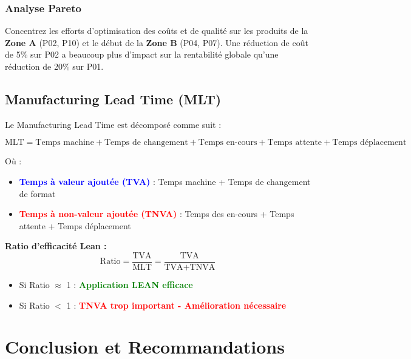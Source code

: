 \documentclass[11pt,a4paper]{article}
\begin{document}
\subsubsection{Analyse Pareto}
Concentrez les efforts d'optimisation des coûts et de qualité sur les produits de la \textbf{Zone A} (P02, P10) et le début de la \textbf{Zone B} (P04, P07). Une réduction de coût de 5\% sur P02 a beaucoup plus d'impact sur la rentabilité globale qu'une réduction de 20\% sur P01.

\newpage
\subsection{Manufacturing Lead Time (MLT)}

Le Manufacturing Lead Time est décomposé comme suit :

\begin{equation}
\text{MLT} = \text{Temps machine} + \text{Temps de changement} + \text{Temps en-cours} + \text{Temps attente} + \text{Temps déplacement}
\end{equation}

Où :
\begin{itemize}[leftmargin=*,itemsep=0.3em]
  \item \textcolor{blue}{\textbf{Temps à valeur ajoutée (TVA)}} : Temps machine + Temps de changement de format
  \item \textcolor{red}{\textbf{Temps à non-valeur ajoutée (TNVA)}} : Temps des en-cours + Temps attente + Temps déplacement
\end{itemize}

\textbf{Ratio d'efficacité Lean :}
\begin{equation}
\text{Ratio} = \frac{\text{TVA}}{\text{MLT}} = \frac{\text{TVA}}{\text{TVA} + \text{TNVA}}
\end{equation}

\begin{itemize}[leftmargin=*,itemsep=0.3em]
  \item Si Ratio $\approx$ 1 : \textcolor{green}{\textbf{Application LEAN efficace}}
  \item Si Ratio $<$ 1 : \textcolor{red}{\textbf{TNVA trop important - Amélioration nécessaire}}
\end{itemize}

\newpage
\section{Conclusion et Recommandations}
\end{document}

